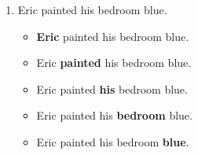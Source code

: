 \documentclass[12pt]{article}
\begin{document}
\begin{enumerate}
\item Eric painted his bedroom blue.
\begin{itemize}
\item \textbf{Eric} painted his bedroom blue.
\item Eric \textbf{painted} his bedroom blue.
\item Eric painted \textbf{his} bedroom blue.
\item Eric painted his \textbf{bedroom} blue.
\item Eric painted his bedroom \textbf{blue}.
\end{itemize}
\end{enumerate}

\end{document}
